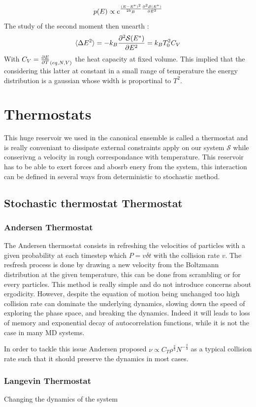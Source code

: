 \documentclass[ansiapaper]{report}
\begin{document}
\begin{multicols}{3}
$$ p(E) \propto e^{\frac{(E - E^*)^2}{2 k_B} \pdv[2]{\mathcal{S}(E^*)}{E}}$$
The study of the second moment then unearth : 
\begin{equation}
    \langle \Delta E^2 \rangle = - k_B \pdv[2]{\mathcal{S}(E^*)}{E} = k_B T_0^2C_V
    \label{eq:fluctuations_energy}
\end{equation}
With $C_V = \pdv{E}{T}_{(eq,N,V)}$ the heat capacity at fixed volume. This implied that the considering this latter at constant in a small range of temperature the energy distribution is a gaussian whose width is proportinal to $T^2$.
\section{Thermostats}
This huge reservoir we used in the canonical ensemble is called a thermostat and is really conveniant to dissipate external constraints apply on our system $\mathcal{S}$ while conserivng a velocity in rough correspondance with temperature. This reservoir has to be able to exert forces and abosrb enery from the system, this interaction can be defined in several ways from deterministic to stochastic method.
\subsection{Stochastic thermostat Thermostat}
\subsubsection{Andersen Thermostat}
The Andersen thermostat consists in refreshing the velocities of particles with a given probability at each timestep which $ P = v \delta t$ with the collision rate $v$. The resfresh process is done by drawing a new velocity from the Boltzmann distribution at the given temperature, this can be done from scrambling or for every particles. This method is really simple and do not introduce concerns about ergodicity. However, despite the equation of motion being unchanged too high collision rate can dominate the underlying dynamics, slowing down the speed of exploring the phase space, and breaking the dynamics. Indeed it will leads to loss of memory and exponential decay of autocorrelation functions, while it is not the case in many MD systems.

In order to tackle this issue Andersen proposed $\nu \propto C_T \rho^{\frac{2}{3}}N^{-\frac{2}{3}}$ as a typical collision rate such that it should preserve the dynamics in most cases.
\subsubsection{Langevin Thermostat}
Changing the dynamics of the system 


\end{multicols}
\end{document}
